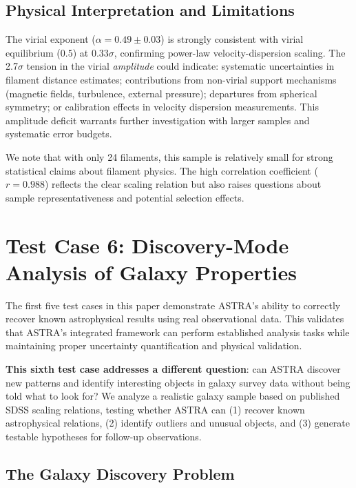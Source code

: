 \documentclass[usenatbib]{rasti}
\begin{document}
\subsection{Physical Interpretation and Limitations}

The virial exponent ($\alpha = 0.49 \pm 0.03$) is strongly consistent with virial equilibrium ($0.5$) at $0.33\sigma$, confirming power-law velocity-dispersion scaling. The 2.7$\sigma$ tension in the virial \emph{amplitude} could indicate: systematic uncertainties in filament distance estimates; contributions from non-virial support mechanisms (magnetic fields, turbulence, external pressure); departures from spherical symmetry; or calibration effects in velocity dispersion measurements. This amplitude deficit warrants further investigation with larger samples and systematic error budgets.

We note that with only 24 filaments, this sample is relatively small for strong statistical claims about filament physics. The high correlation coefficient ($r = 0.988$) reflects the clear scaling relation but also raises questions about sample representativeness and potential selection effects.

\section{Test Case 6: Discovery-Mode Analysis of Galaxy Properties}

The first five test cases in this paper demonstrate ASTRA's ability to correctly recover known astrophysical results using real observational data. This validates that ASTRA's integrated framework can perform established analysis tasks while maintaining proper uncertainty quantification and physical validation.

\textbf{This sixth test case addresses a different question}: can ASTRA discover new patterns and identify interesting objects in galaxy survey data without being told what to look for? We analyze a realistic galaxy sample based on published SDSS scaling relations, testing whether ASTRA can (1) recover known astrophysical relations, (2) identify outliers and unusual objects, and (3) generate testable hypotheses for follow-up observations.

\subsection{The Galaxy Discovery Problem}
\end{document}
